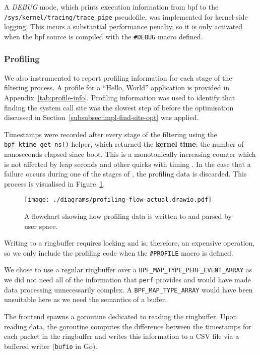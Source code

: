 A \textit{DEBUG} mode,
which prints execution information from \ac{bpf} to the
\texttt{/sys/kernel/tracing/trace\_pipe} pseudofile, was implemented for
kernel-side logging. This incurs a substantial performance penalty, so it is only
activated when the \ac{bpf} source is compiled with the \texttt{\#DEBUG} macro
defined.

\subsubsection{Profiling}

We also instrumented \af to report profiling information for each stage of the
filtering process. A profile for a ``Hello, World'' application is provided in 
Appendix~\ref{tab:profile-info}. Profiling information was used to identify that
finding the system call site was the slowest step of \af before the optimisation
discussed in Section~\ref{subsubsec:impl-find-site-opt} was applied.

Timestamps were recorded after every stage of the filtering using the
\texttt{bpf\_ktime\_get\_ns()} helper, which returned the \textbf{kernel time}:
the number of nanoseconds elapsed since boot. This is a monotonically increasing
counter which is not affected by leap seconds and other quirks with timing
\cite{ebpf-bpf-ktime-get-ns-2025, LAMPORT_CLOCKS}. In the
case that a failure occurs during one of the stages of \af, the profiling data
is discarded. This process is visualised in
Figure~\ref{fig:profiling-data-flow}.

\begin{figure}[hbpt]
\centering
\texttt{[image: ./diagrams/profiling-flow-actual.drawio.pdf]}
\caption{A flowchart showing how profiling data is written to and parsed by
user space.}
\label{fig:profiling-data-flow}
\end{figure}

Writing to a ringbuffer requires locking and is, therefore, an expensive
operation, so we only include the profiling code when the \texttt{\#PROFILE} macro
is defined.

We chose to use a regular ringbuffer over a 
\texttt{BPF\_MAP\_TYPE\_PERF\_EVENT\_ARRAY} as we did not need all of the
information that \texttt{perf} provides and would have made data processing
unnecessarily complex. A \texttt{BPF\_MAP\_TYPE\_ARRAY} would have been
unsuitable here as we need the semantics of a buffer.

The frontend spawns a goroutine dedicated to reading the ringbuffer.
Upon reading data, the goroutine computes the difference between the timestamps for each 
packet in the ringbuffer and writes this information to a CSV file via a
buffered writer (\texttt{bufio} in Go). 

